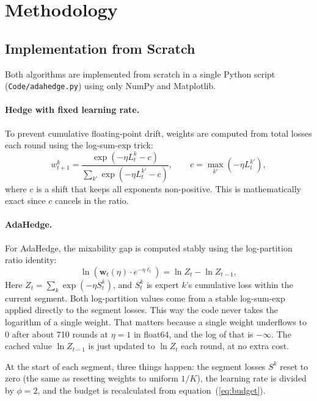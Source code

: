\documentclass[11pt,a4paper]{article}
\newcommand{\wt}{\boldsymbol{w}_t}
\newcommand{\bsl}{\boldsymbol{\ell}}
\begin{document}
\section{Methodology}
\label{sec:methodology}

\subsection{Implementation from Scratch}

Both algorithms are implemented from scratch in a single Python script (\texttt{Code/adahedge.py}) using only NumPy and Matplotlib.

\paragraph{Hedge with fixed learning rate.}
To prevent cumulative floating-point drift, weights are computed from total losses each round using the log-sum-exp trick:
\[
  w_{t+1}^k = \frac{\exp(-\eta L_t^k - c)}{\sum_{k'} \exp(-\eta L_t^{k'} - c)},
  \qquad c = \max_{k'} (-\eta L_t^{k'}),
\]
where $c$ is a shift that keeps all exponents non-positive.  This is
mathematically exact since $c$ cancels in the ratio.

\paragraph{AdaHedge.}
For AdaHedge, the mixability gap is computed stably using the log-partition ratio identity:
\begin{equation}
  \label{eq:logZ_identity}
  \ln\!\left(\wt(\eta) \cdot e^{-\eta \bsl_t}\right)
  = \ln Z_t - \ln Z_{t-1},
\end{equation}
Here $Z_t = \sum_k \exp(-\eta S_t^k)$, and $S_t^k$ is expert $k$'s cumulative
loss within the current segment. Both log-partition values come from a stable
log-sum-exp applied directly to the segment losses. This way the code never
takes the logarithm of a single weight. That matters because a single weight
underflows to $0$ after about 710 rounds at $\eta = 1$ in float64, and the log
of that is $-\infty$. The cached value $\ln Z_{t-1}$ is just updated to
$\ln Z_t$ each round, at no extra cost.

At the start of each segment, three things happen: the segment losses $S^k$
reset to zero (the same as resetting weights to uniform $1/K$), the learning
rate is divided by $\phi = 2$, and the budget is recalculated from
equation~(\ref{eq:budget}).
\end{document}
